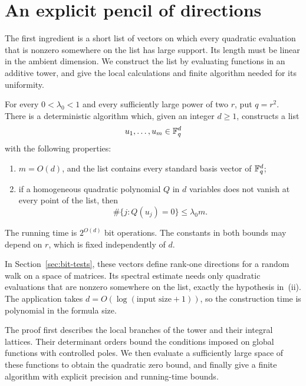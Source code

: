 \section{An explicit pencil of directions}\label{sec:pencil}

The first ingredient is a short list of vectors on which every quadratic
evaluation that is nonzero somewhere on the list has large support.
Its length must be linear in the
ambient dimension.  We construct the list by evaluating functions in an
additive tower, and give the local calculations and finite algorithm needed
for its uniformity.

\begin{lemma}\label{lem:pencil}
For every $0<\lambda_0<1$ and every sufficiently large power of two $r$,
put $q=r^2$.  There is a deterministic algorithm which, given an integer
$d\geq 1$, constructs a list
\[
 u_1,\ldots,u_m\in\mathbb F_q^d
\]
with the following properties:
\begin{enumerate}[label=(\roman*)]
 \item $m=O(d)$, and the list contains every standard basis vector of
 $\mathbb F_q^d$;
 \item if a homogeneous quadratic polynomial $Q$ in $d$ variables does
 not vanish at every point of the list, then
 \[
   \#\{j:Q(u_j)=0\}\leq\lambda_0m.
 \]
\end{enumerate}
The running time is $2^{O(d)}$ bit operations.  The constants in both bounds
may depend on $r$, which is fixed independently of $d$.
\end{lemma}

In Section~\ref{sec:bit-tests}, these vectors define rank-one directions
for a random walk on a space of matrices. Its spectral estimate needs
only quadratic evaluations that are nonzero somewhere on the list,
exactly the hypothesis in~\textup{(ii)}. The application takes
$d=O(\log(\text{input size}+1))$, so the construction time is polynomial
in the formula size.

The proof first describes the local branches of the tower and their
integral lattices. Their determinant orders bound the conditions imposed
on global functions with controlled poles. We then evaluate a sufficiently
large space of these functions to obtain the quadratic zero bound, and
finally give a finite algorithm with explicit precision and running-time
bounds.

